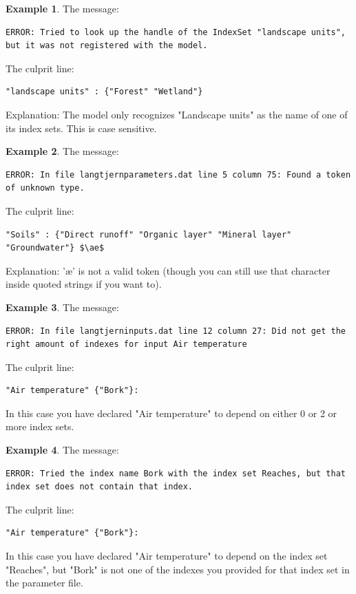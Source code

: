 \documentclass[11pt]{article}
\theoremstyle{definition}
\newtheorem{myexample}{Example}
\newenvironment{example}%
  {\begin{lrbox}{\examplebox}%
   \begin{minipage}{\dimexpr\linewidth-2\fboxsep}
   \begin{myexample}}%
  {\end{myexample}%
   \end{minipage}%
   \end{lrbox}%
   \begin{trivlist}
     \item[]\colorbox{silver}{\usebox\examplebox}
   \end{trivlist}}
\begin{document}
\begin{example}
The message:
\begin{lstlisting}
ERROR: Tried to look up the handle of the IndexSet "landscape units", but it was not registered with the model.
\end{lstlisting}
The culprit line:
\begin{lstlisting}
"landscape units" : {"Forest" "Wetland"}
\end{lstlisting}
Explanation: The model only recognizes "Landscape units" as the name of one of its index sets. This is case sensitive.
\end{example}

\begin{example}
The message:
\begin{lstlisting}
ERROR: In file langtjernparameters.dat line 5 column 75: Found a token of unknown type.
\end{lstlisting}
The culprit line:
\begin{lstlisting}[mathescape]
"Soils" : {"Direct runoff" "Organic layer" "Mineral layer" "Groundwater"} $\ae$
\end{lstlisting}
Explanation: '\ae' is not a valid token (though you can still use that character inside quoted strings if you want to).
\end{example}

\begin{example}
The message:
\begin{lstlisting}
ERROR: In file langtjerninputs.dat line 12 column 27: Did not get the right amount of indexes for input Air temperature
\end{lstlisting}
The culprit line:
\begin{lstlisting}[mathescape]
"Air temperature" {"Bork"}:
\end{lstlisting}
In this case you have declared "Air temperature" to depend on either 0 or 2 or more index sets.
\end{example}

\begin{example}
The message:
\begin{lstlisting}
ERROR: Tried the index name Bork with the index set Reaches, but that index set does not contain that index.
\end{lstlisting}
The culprit line:
\begin{lstlisting}[mathescape]
"Air temperature" {"Bork"}:
\end{lstlisting}
In this case you have declared "Air temperature" to depend on the index set "Reaches", but "Bork" is not one of the indexes you provided for that index set in the parameter file.
\end{example}
\end{document}
